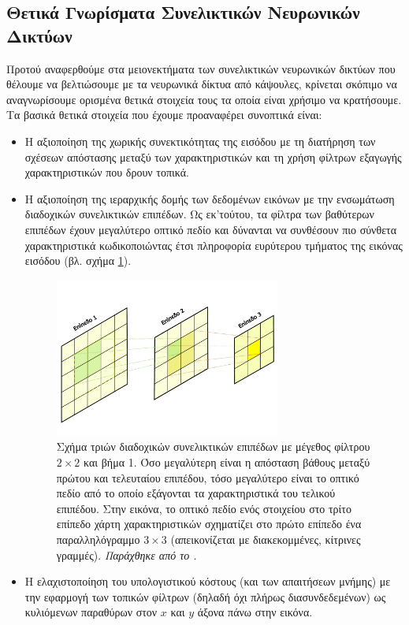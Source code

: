 \subsection{Θετικά Γνωρίσματα Συνελικτικών Νευρωνικών Δικτύων}
\label{sec:positives_of_cnns}
Προτού αναφερθούμε στα μειονεκτήματα των συνελικτικών νευρωνικών δικτύων που θέλουμε να βελτιώσουμε με τα νευρωνικά δίκτυα από κάψουλες, κρίνεται σκόπιμο να αναγνωρίσουμε ορισμένα θετικά στοιχεία τους τα οποία είναι χρήσιμο να κρατήσουμε. Τα βασικά θετικά στοιχεία που έχουμε προαναφέρει συνοπτικά είναι:
\begin{itemize}
\item Η αξιοποίηση της χωρικής συνεκτικότητας της εισόδου με τη διατήρηση των σχέσεων απόστασης μεταξύ των χαρακτηριστικών και τη χρήση φίλτρων εξαγωγής χαρακτηριστικών που δρουν τοπικά.
\item Η αξιοποίηση της ιεραρχικής δομής των δεδομένων εικόνων με την ενσωμάτωση διαδοχικών συνελικτικών επιπέδων. Ως εκ'τούτου, τα φίλτρα των βαθύτερων επιπέδων έχουν μεγαλύτερο οπτικό πεδίο και δύνανται να συνθέσουν πιο σύνθετα χαρακτηριστικά κωδικοποιώντας έτσι πληροφορία ευρύτερου τμήματος της εικόνας εισόδου (βλ. σχήμα \ref{fig:fov}).
\begin{figure}[h]
  \centering
  \includegraphics[width=0.7\textwidth]{images/chapter theoritical background/FOV_gr.pdf}
  \caption{Σχήμα τριών διαδοχικών συνελικτικών επιπέδων με μέγεθος φίλτρου $2\times2$ και βήμα 1. Όσο μεγαλύτερη είναι η απόσταση βάθους μεταξύ πρώτου και τελευταίου επιπέδου, τόσο μεγαλύτερο είναι το οπτικό πεδίο από το οποίο εξάγονται τα χαρακτηριστικά του τελικού επιπέδου. Στην εικόνα, το οπτικό πεδίο ενός στοιχείου στο τρίτο επίπεδο χάρτη χαρακτηριστικών σχηματίζει στο πρώτο επίπεδο ένα παραλληλόγραμμο $3\times3$ (απεικονίζεται με διακεκομμένες, κίτρινες γραμμές). \textit{Παράχθηκε από το \href{https://inkscape.org/}{}.}} 
  \label{fig:fov}
\end{figure} 

\item Η ελαχιστοποίηση του υπολογιστικού κόστους (και των απαιτήσεων μνήμης) με την εφαρμογή των τοπικών φίλτρων (δηλαδή όχι πλήρως διασυνδεδεμένων) ως κυλιόμενων παραθύρων στον $x$ και $y$ άξονα πάνω στην εικόνα.
\end{itemize}
